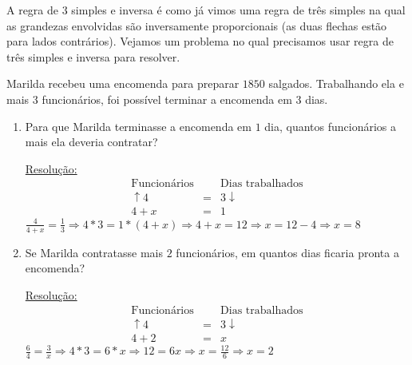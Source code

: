 A regra de 3 simples e inversa é como já vimos uma regra de três simples na qual as grandezas envolvidas são inversamente proporcionais (as duas flechas estão para lados contrários). Vejamos um problema no qual precisamos usar regra de três simples e inversa para resolver.

\begin{exem}
\begin{enumerate}
  Marilda recebeu uma encomenda para preparar $1850$ salgados. Trabalhando ela e mais $3$ funcionários, foi possível terminar a encomenda em $3$ dias.
  \begin{enumerate}
  \item Para que Marilda terminasse a encomenda em $1$ dia, quantos funcionários a mais ela deveria contratar?

  \underline{Resolução:}
  \begin{eqnarray*}
   \text{Funcionários} & & \text{Dias trabalhados} \\
   \uparrow 4 & = & 3 \downarrow \\
   4 + x & = & 1
  \end{eqnarray*}
  $\frac{4}{4+x}= \frac{1}{3} \Rightarrow 4*3=1*(4 + x) \Rightarrow 4 + x = 12 \Rightarrow x = 12 - 4 \Rightarrow x= 8$
  \fim

  \item Se Marilda contratasse mais $2$ funcionários, em quantos dias ficaria pronta a encomenda?

  \underline{Resolução:}
  \begin{eqnarray*}
   \text{Funcionários} & & \text{Dias trabalhados} \\
   \uparrow 4 & = & 3 \downarrow \\
   4 + 2 & = & x
  \end{eqnarray*}
  $\frac{6}{4}= \frac{3}{x} \Rightarrow 4*3=6*x \Rightarrow 12 = 6x \Rightarrow x=\frac{12}{6} \Rightarrow x = 2$
  \fim

  \end{enumerate}
\end{enumerate}
\end{exem}

